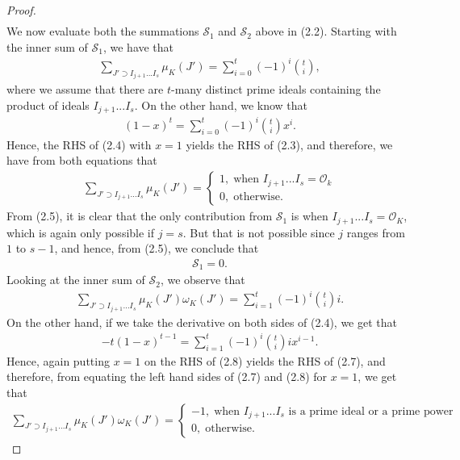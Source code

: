 \documentclass[12pt]{article}
\numberwithin{equation}{section}
\numberwithin{equation}{section}
\begin{document}
\begin{proof}
\begin{align}
\end{align}
We now evaluate both the summations $\mathcal{S}_1$ and $\mathcal{S}_2$ above in (2.2). Starting with the inner sum of $\mathcal{S}_1$, we have that
\begin{align}
    \sum_{J' \supset I_{j+1}...I_s}\mu_K(J') = \sum_{i=0}^t (-1)^i{t \choose i},
\end{align}
where we assume that there are $t$-many distinct prime ideals containing the product of ideals $I_{j+1}...I_s$. 
On the other hand, we know that 
\begin{align}
    (1-x)^t = \sum_{i=0}^t (-1)^i{t \choose i} x^i.
\end{align}
Hence, the RHS of (2.4) with $x=1$ yields the RHS of (2.3), and therefore, we have from both equations that
\begin{align}
     \sum_{J' \supset I_{j+1}...I_s}\mu_K(J') = \begin{cases}
         1,\;\text{when $I_{j+1}...I_s = \mathcal{O}_k$} \\
         0,\;\text{otherwise.}
     \end{cases}
\end{align}
From (2.5), it is clear that the only contribution from $\mathcal{S}_1$ is when $I_{j+1}...I_s = \mathcal{O}_K$, which is again only possible if $j=s$. But that is not possible since $j$ ranges from $1$ to $s-1$, and hence, from (2.5), we conclude that 
\begin{align}
    \mathcal{S}_1 = 0.
\end{align}
Looking at the inner sum of $\mathcal{S}_2$, we observe that
\begin{align}
    \sum_{J' \supset I_{j+1}...I_s} \mu_K(J')\omega_K(J') = \sum_{i=1}^{t}(-1)^i{t \choose i}i.
\end{align}
On the other hand, if we take the derivative on both sides of (2.4), we get that
\begin{align}
    -t(1-x)^{t-1} = \sum_{i=1}^{t}(-1)^i{t \choose i}ix^{i-1}.
\end{align}
Hence, again putting $x=1$ on the RHS of (2.8) yields the RHS of (2.7), and therefore, from equating the left hand sides of (2.7) and (2.8) for $x=1$, we get that 
\begin{align}
      \sum_{J' \supset I_{j+1}...I_s} \mu_K(J')\omega_K(J') = \begin{cases}
          -1,\;\text{when $I_{j+1}...I_s$ is a prime ideal or a prime power} \\
          0,\;\text{otherwise.}
      \end{cases}

\end{align}
\end{proof}
\end{document}
